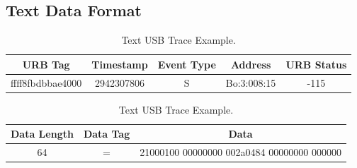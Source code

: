 \documentclass{kththesis}
\begin{document}
\subsection{Text Data Format}
\begin{table}
\centering
\begin{tabular}{|c|c|c|c|c|}
\hline
URB Tag & Timestamp & Event Type & Address & URB Status\\
\hline
ffff8fbdbbae4000 & 2942307806 & S & Bo:3:008:15 & -115\\ 
\hline
\end{tabular}
\begin{tabular}{|c|c|c|}
\hline
Data Length & Data Tag & Data\\
\hline
64 & = & 21000100 00000000 002a0484 00000000 000000\\
\hline
\end{tabular}
\caption{Text USB Trace Example.}
\end{table}
\end{document}
